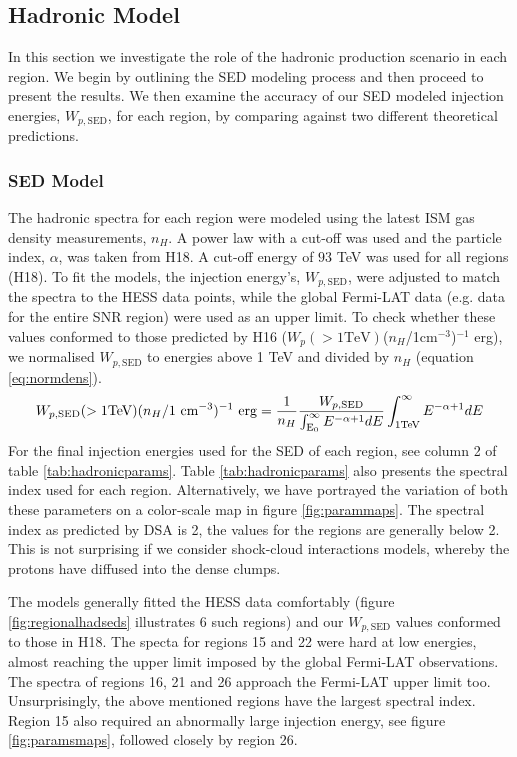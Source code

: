 \documentclass[12pt,a4paper]{article}
\begin{document}
\subsection{Hadronic Model} 
In this section we investigate the role of the hadronic production scenario in each region. We begin by outlining the SED modeling process and then proceed to present the results. We then examine the accuracy of our SED modeled injection energies, $W_{p,\mathrm{SED}}$, for each region, by comparing against two different theoretical predictions. 

\subsubsection{SED Model}
The hadronic spectra for each region were modeled using the latest ISM gas density measurements, $n_H$. 
A power law with a cut-off was used and the particle index, $\alpha$, was taken from H18. 
A cut-off energy of $93$ TeV was used for all regions (H18). 
To fit the models, the injection energy's, $W_{p,\mathrm{SED}}$, were adjusted to match the spectra to the HESS data points, while the global Fermi-LAT data (e.g. data for the entire SNR region) were used as an upper limit. 
To check whether these values conformed to those predicted by H16 ($W_p\mathrm{(>1TeV)}$($n_H$/1cm$^{-3}$)$^{-1}$ erg), we normalised $W_{p,\mathrm{SED}}$ to energies above 1 TeV and divided by $n_H$ (equation \ref{eq:normdens}).
\begin{equation}\label{eq:normdens}
W_{p,\mathrm{SED}}\mathrm{(>1TeV)} (n_H/1 \ \mathrm{cm}^{-3})^{-1} \ \mathrm{erg} = \dfrac{1}{n_H}\dfrac{W_{p,\mathrm{SED}}}{\int_{\mathrm{E_0}}^{\infty}  E^{-\alpha + 1} dE}\int_{1 \mathrm{TeV}}^{\infty}  E^{-\alpha + 1} dE\\
\end{equation}
For the final injection energies used for the SED of each region, see column 2 of table \ref{tab:hadronicparams}.
Table \ref{tab:hadronicparams} also presents the spectral index used for each region.
Alternatively, we have portrayed the variation of both these parameters on a color-scale map in figure \ref{fig:parammaps}.
The spectral index as predicted by DSA is 2, the values for the regions are generally below 2.
This is not surprising if we consider shock-cloud interactions models, whereby the protons have diffused into the dense clumps. 

The models generally fitted the HESS data comfortably (figure \ref{fig:regionalhadseds} illustrates 6 such regions) and our $W_{p,\mathrm{SED}}$ values conformed to those in H18.
The specta for regions 15 and 22 were hard at low energies, almost reaching the upper limit imposed by the global Fermi-LAT observations. 
The spectra of regions 16, 21 and 26 approach the Fermi-LAT upper limit too. 
Unsurprisingly, the above mentioned regions have the largest spectral index.
Region 15 also required an abnormally large injection energy, see figure \ref{fig:paramsmaps}, followed closely by region 26.
\end{document}
